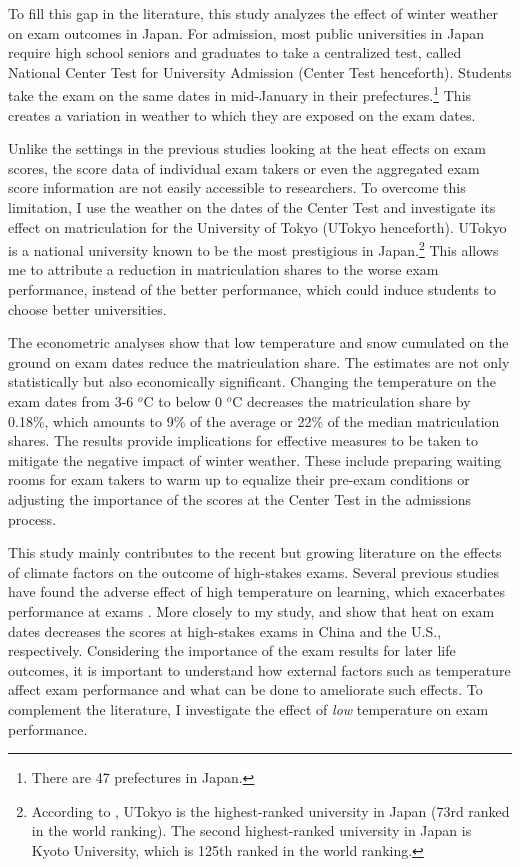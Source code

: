 \documentclass[12pt,letterpaper]{article}
\begin{document}
To fill this gap in the literature, this study analyzes the effect of winter weather on exam outcomes in Japan.
For admission, most public universities in Japan require high school seniors and graduates to take a centralized test, called National Center Test for University Admission (Center Test henceforth).
Students take the exam on the same dates in mid-January in their prefectures.\footnote{
  There are 47 prefectures in Japan.
}
This creates a variation in weather to which they are exposed on the exam dates.

Unlike the settings in the previous studies looking at the heat effects on exam scores, the score data of individual exam takers or even the aggregated exam score information are not easily accessible to researchers.
To overcome this limitation, I use the weather on the dates of the Center Test and investigate its effect on matriculation for the University of Tokyo (UTokyo henceforth).
UTokyo is a national university known to be the most prestigious in Japan.\footnote{
  According to \citet{usnews}, UTokyo is the highest-ranked university in Japan (73rd ranked in the world ranking).
  The second highest-ranked university in Japan is Kyoto University, which is 125th ranked in the world ranking.
}
This allows me to attribute a reduction in matriculation shares to the worse exam performance, instead of the better performance, which could induce students to choose better universities.

The econometric analyses show that low temperature and snow cumulated on the ground on exam dates reduce the matriculation share.
The estimates are not only statistically but also economically significant.
Changing the temperature on the exam dates from 3-6 $^o$C to below 0 $^o$C decreases the matriculation share by 0.18\%, which amounts to 9\% of the average or 22\% of the median matriculation shares.
The results provide implications for effective measures to be taken to mitigate the negative impact of winter weather.
These include preparing waiting rooms for exam takers to warm up to equalize their pre-exam conditions or adjusting the importance of the scores at the Center Test in the admissions process.

This study mainly contributes to the recent but growing literature on the effects of climate factors on the outcome of high-stakes exams.
Several previous studies have found the adverse effect of high temperature on learning, which exacerbates performance at exams \citep{Park2020b, Cho2017}.
More closely to my study, \citet{GraffZivin2020} and \citet{Park2020a} show that heat on exam dates decreases the scores at high-stakes exams in China and the U.S., respectively.
Considering the importance of the exam results for later life outcomes, it is important to understand how external factors such as temperature affect exam performance and what can be done to ameliorate such effects.
To complement the literature, I investigate the effect of \textit{low} temperature on exam performance.
\end{document}
